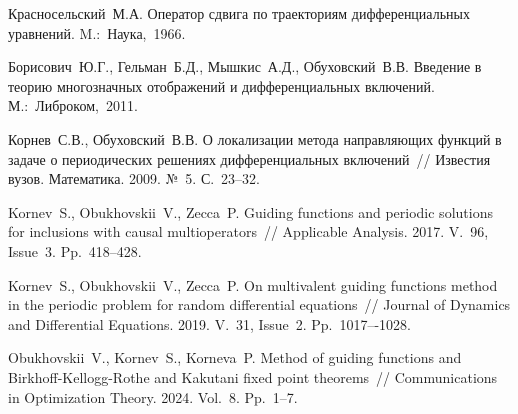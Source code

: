 %

\begin{thebibliography}{9} %

 Красносельский~М.А. Оператор сдвига по траекториям дифференциальных уравнений. M.:~Наука,~1966.

 Борисович~Ю.Г., Гельман~Б.Д., Мышкис~А.Д., Обуховский~В.В. Введение в теорию многозначных отображений и дифференциальных включений. М.:~Либроком,~2011.

 Корнев~С.В., Обуховский~В.В. О локализации метода направляющих функций в задаче о периодических решениях дифференциальных включений~// Известия вузов. Математика. 2009. №~5. С.~23--32.

 Kornev~S., Obukhovskii~V., Zecca~P. Guiding functions and periodic solutions for inclusions with causal multioperators~// Applicable Analysis. 2017. V.~96, Issue~3. Pp.~418--428.

 Kornev~S., Obukhovskii~V., Zecca~P. On multivalent guiding functions method in the periodic problem for random differential equations~// Journal of Dynamics and Differential Equations. 2019. V.~31, Issue~2. Pp.~1017–-1028.

   Obukhovskii~V., Kornev~S., Korneva~P. Method of guiding functions and Birkhoff-Kellogg-Rothe and Kakutani fixed point theorems~// Communications in Optimization Theory. 2024. Vol.~8. Pp.~1--7.

\end{thebibliography}





%
